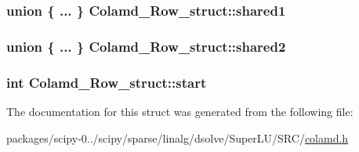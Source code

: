 \subsubsection[{shared1}]{\setlength{\rightskip}{0pt plus 5cm}union \{ ... \}   Colamd\+\_\+\+Row\+\_\+struct\+::shared1}\label{structColamd__Row__struct_a9f8a228dc157733ece95870aa59b14c0}
\hypertarget{structColamd__Row__struct_a3493ff232ba69ec8bc78dc697901a2ce}{}
\subsubsection[{shared2}]{\setlength{\rightskip}{0pt plus 5cm}union \{ ... \}   Colamd\+\_\+\+Row\+\_\+struct\+::shared2}\label{structColamd__Row__struct_a3493ff232ba69ec8bc78dc697901a2ce}
\hypertarget{structColamd__Row__struct_a24285056395b1cf2e28ea3810d67d09d}{}
\subsubsection[{start}]{\setlength{\rightskip}{0pt plus 5cm}int Colamd\+\_\+\+Row\+\_\+struct\+::start}\label{structColamd__Row__struct_a24285056395b1cf2e28ea3810d67d09d}


The documentation for this struct was generated from the following file\+:\begin{DoxyCompactItemize}
\item 
packages/scipy-\/0../scipy/sparse/linalg/dsolve/\+Super\+L\+U/\+S\+R\+C/\hyperlink{colamd_8h}{colamd.\+h}\end{DoxyCompactItemize}
